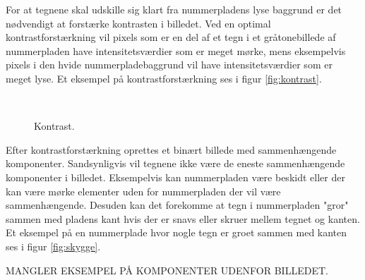 For at tegnene skal udskille sig klart fra nummerpladens lyse baggrund er det nødvendigt at forstærke kontrasten i billedet. Ved en optimal kontrastforstærkning vil pixels som er en del af et tegn i et gråtonebillede af nummerpladen have intensitetsværdier som er meget mørke, mens eksempelvis pixels i den hvide nummerpladebaggrund vil have intensitetsværdier som er meget lyse. Et eksempel på kontrastforstærkning ses i figur \vref{fig:kontrast}.

\begin{figure}[htp]
  \centering
  \begin{minipage}[c]{8 cm}
    \\
  \end{minipage}
  \caption{Kontrast.}
  \label{fig:kontrast}
\end{figure}

Efter kontrastforstærkning oprettes et binært billede med sammenhængende komponenter. Sandsynligvis vil tegnene ikke være de eneste sammenhængende komponenter i billedet. Eksempelvis kan nummerpladen være beskidt eller der kan være mørke elementer uden for nummerpladen der vil være sammenhængende. Desuden kan det forekomme at tegn i nummerpladen "gror" sammen med pladens kant hvis der er snavs eller skruer mellem tegnet og kanten. Et eksempel på en nummerplade hvor nogle tegn er groet sammen med kanten ses i figur \vref{fig:skygge}.

MANGLER EKSEMPEL PÅ KOMPONENTER UDENFOR BILLEDET.

